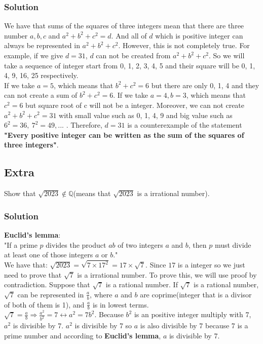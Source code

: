 \documentclass{article}
\begin{document}
\subsubsection*{Solution}
We have that sums of the squares of three integers mean that there are three number $a, b, c$ and $a^2 + b^2 + c^2 = d$. And all of $d$ which is positive integer can always be represented in $a^2 + b^2 + c^2$. However, this is not completely true. For example, if we give $d = 31$, $d$ can not be created from $a^2 + b^2 + c^2$. So we will take a sequence of integer start from 0, 1, 2, 3, 4, 5 and their square will be 0, 1, 4, 9, 16, 25 respectively.\\

If we take $a = 5$, which means that $b^2 + c^2 = 6$ but there are only 0, 1, 4 and they can not create a sum of $b^2 + c^2 = 6$. If we take $a = 4, b = 3$, which means that $c^2 = 6$ but square root of c will not be a integer. Moreover, we can not create $a^2 + b^2 + c^2 = 31$ with small value such as 0, 1, 4, 9 and big value such as $6^2 = 36,\ 7^2 = 49, ...$ . Therefore, $d = 31$ is a counterexample of the statement \textbf{"Every positive integer can be written as the sum of the squares of three integers"}.
\subsection*{Extra}
Show that $\sqrt{2023} \notin \mathbb{Q}$(means that $\sqrt{2023}$ is a irrational number).
\subsubsection*{Solution}
\textbf{Euclid's lemma}: \\

"If a prime $p$ divides the product $ab$ of two integers $a$ and $b$, then $p$ must divide at least one of those integers $a$ or $b$."\\

We have that: $\sqrt{2023} = \sqrt{7\times17^2} = 17\times\sqrt{7}$. Since $17$ is a integer so we just need to prove that $\sqrt{7}$ is a irrational number. To prove this, we will use proof by contradiction. Suppose that $\sqrt{7}$ is a rational number. If $\sqrt{7}$ is a rational number, $\sqrt{7}$ can be represented in $\frac{a}{b}$, where $a$ and $b$ are coprime(integer that is a divisor of both of them is 1), and $\frac{a}{b}$ is in lowest terms.\\

$\sqrt{7} = \frac{a}{b} \Rightarrow \frac{a^2}{b^2} = 7 \leftrightarrow a^2 = 7b^2$. Because $b^2$ is an positive integer multiply with 7, $a^2$ is divisible by 7. $a^2$ is divisible by 7 so $a$ is also divisible by 7 because 7 is a prime number and according to \textbf{Euclid's lemma}, $a$ is divisible by 7.\\
\end{document}
